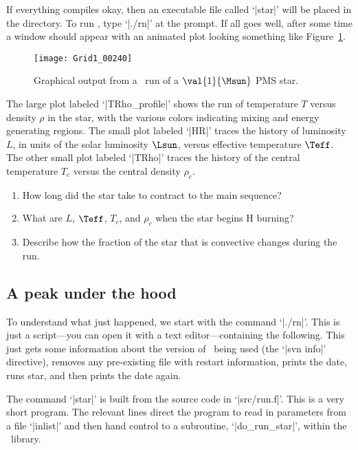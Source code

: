 If everything compiles okay, then an executable file called `|star|' will be placed in the directory. To run \mesa, type `|./rn|' at the prompt.  If all goes well, after some time a window should appear with an animated plot looking something like Figure~\ref{f.mesa-fig}.

\begin{figure}[htbp]
\centering\texttt{[image: Grid1\_00240]}
\caption{Graphical output from a \mesa\ run of a $\val{1}{\Msun}$ PMS star. \label{f.mesa-fig}}
\end{figure}

The large plot labeled `|TRho_profile|' shows the run of temperature $T$ versus density $\rho$ in the star, with the various colors indicating mixing and energy generating regions. The small plot labeled `|HR|' traces the history of luminosity $L$, in units of the solar luminosity $\Lsun$, versus effective temperature $\Teff$. The other small plot labeled `|TRho|' traces the history of the central temperature $T_{c}$ versus the central density $\rho_{c}$.

\begin{exercisebox}
\begin{enumerate}
\item How long did the star take to contract to the main sequence?
\item What are $L$, $\Teff$, $T_{c}$, and $\rho_{c}$ when the star begins H burning?
\item Describe how the fraction of the star that is convective changes during the run.
\end{enumerate}
\end{exercisebox}

\subsection{A peak under the hood}
To understand what just happened, we start with the command `|./rn|'. This is just a script---you can open it with a text editor---containing the following.
This just gets some information about the version of \mesa\ being used (the `|svn info|' directive), removes any pre-existing file with restart information, prints the date, runs star, and then prints the date again.

The command `|star|' is built from the source code in `|src/run.f|'. This is a very short program.  The relevant lines
direct the program to read in parameters from a file `|inlist|' and then hand control to a subroutine, `|do_run_star|', within the \mesa\ library.

